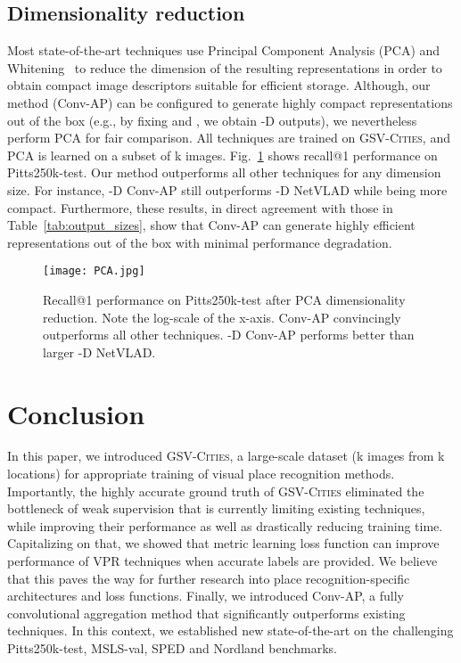 \documentclass{article}
\begin{document}
\subsection{Dimensionality reduction}\label{sec:exp:pca}
Most state-of-the-art techniques use Principal Component Analysis (PCA) and Whitening~\cite{jegou2012negative} to reduce the dimension of the resulting representations in order to obtain compact image descriptors suitable for efficient storage. Although, our method (Conv-AP) can be configured to generate highly compact representations out of the box (e.g., by fixing  and , we obtain -D outputs), we nevertheless perform PCA for fair comparison. All techniques are trained on \textsc{GSV-Cities}, and PCA is learned on a subset of k images. Fig.~\ref{fig:PCA} shows recall@1 performance on Pitts250k-test. Our method outperforms all other techniques for any dimension size. For instance, -D Conv-AP still outperforms -D NetVLAD while being  more compact. Furthermore, these results, in direct agreement with those in Table~\ref{tab:output_sizes}, show that Conv-AP can generate highly efficient representations out of the box with minimal performance degradation.

\begin{figure}[tb]
      \centering
\texttt{[image: PCA.jpg]}
  \caption{Recall@1 performance on Pitts250k-test after PCA dimensionality reduction. Note the log-scale of the x-axis. Conv-AP convincingly outperforms all other techniques. -D Conv-AP performs better than  larger -D NetVLAD.}
      \label{fig:PCA}
\end{figure}

\section{Conclusion}
In this paper, we introduced \textsc{GSV-Cities}, a large-scale dataset (k images from k locations) for appropriate training of visual place recognition methods. Importantly, the highly accurate ground truth of \textsc{GSV-Cities} eliminated the bottleneck of weak supervision that is currently limiting existing techniques, while improving their performance as well as drastically reducing training time.
Capitalizing on that, we showed that metric learning loss function can improve performance of VPR techniques when accurate labels are provided. We believe that this paves the way for further research into place recognition-specific architectures and loss functions.
Finally, we introduced Conv-AP, a fully convolutional aggregation method that significantly outperforms existing techniques. In this context, we established new state-of-the-art on the challenging Pitts250k-test, MSLS-val, SPED and Nordland benchmarks.
\end{document}
